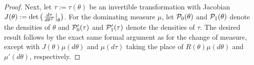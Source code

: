 \begin{proof}
Next, let $\tau := \tau(\theta)$ be an invertible transformation with Jacobian
$J(\theta) := \mathrm{det}\left(\left.\frac{d\tau}{d\theta^T}\right\vert_{\theta}\right)$. For
the dominating measure $\mu$, let $\mathcal{P}_{0}(\theta)$ and $\mathcal{P}_{1}(\theta)$ denote
the densities of $\theta$ and $\mathcal{P}_{0}'(\tau)$ and $\mathcal{P}_{1}'(\tau)$ denote the
densities of $\tau$.  The desired result follows by the exact same formal
argument as for the change of measure, except with $J(\theta) \mu(d\theta)$
and $\mu(d\tau)$ taking the place of $R(\theta) \mu(d\theta)$ and
$\mu'(d\theta)$, respectively.
%
\end{proof}
















